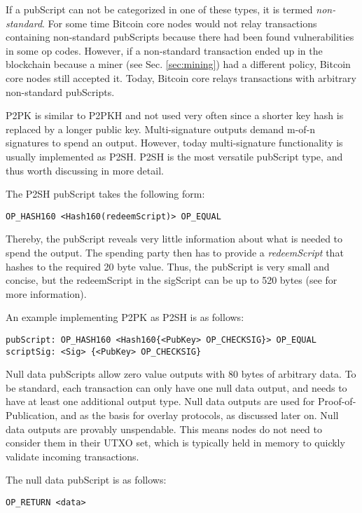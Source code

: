 If a pubScript can not be categorized in one of these types, it is termed \emph{non-standard}. For some time Bitcoin core nodes would not relay transactions containing non-standard pubScripts because there had been found vulnerabilities in some op codes. However, if a non-standard transaction ended up in the blockchain because a miner  (see Sec. \ref{sec:mining}) had a different policy, Bitcoin core nodes still accepted it. Today, Bitcoin core relays transactions with arbitrary non-standard pubScripts.

\ac{P2PK} is similar to \ac{P2PKH} and not used very often since a shorter key hash is replaced by a longer public key. Multi-signature outputs demand m-of-n signatures to spend an output. However, today multi-signature functionality is usually implemented as \ac{P2SH}. \ac{P2SH} is the most versatile pubScript type, and thus worth discussing in more detail.

The \ac{P2SH} pubScript takes the following form:

\begin{lstlisting}
OP_HASH160 <Hash160(redeemScript)> OP_EQUAL
\end{lstlisting}

Thereby, the pubScript reveals very little information about what is needed to spend the output. The spending party then has to provide a \emph{redeemScript} that hashes to the required 20 byte value. Thus, the pubScript is very small and concise, but the redeemScript in the sigScript can be up to 520 bytes (see \parencite{bip16} for more information). 

An example implementing \ac{P2PK} as \ac{P2SH} is as follows:

\begin{lstlisting}[breaklines]
pubScript: OP_HASH160 <Hash160{<PubKey> OP_CHECKSIG}> OP_EQUAL
scriptSig: <Sig> {<PubKey> OP_CHECKSIG}
\end{lstlisting}

Null data pubScripts allow zero value outputs with 80 bytes of arbitrary data. To be standard, each transaction can only have one null data output, and needs to have at least one additional output type. Null data outputs are used for Proof-of-Publication, and as the basis for overlay protocols, as discussed later on. Null data outputs are provably unspendable. This means nodes do not need to consider them in their \ac{UTXO} set, which is typically held in memory to quickly validate incoming transactions. 

The null data pubScript is as follows:
\begin{lstlisting}
OP_RETURN <data>
\end{lstlisting}

